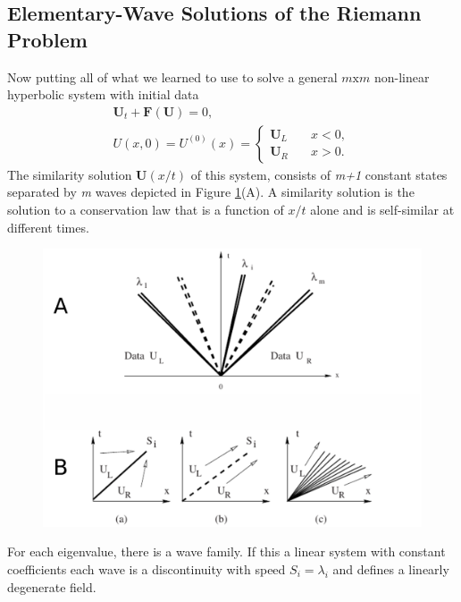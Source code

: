 \documentclass[]{article}
\begin{document}
	\subsection{Elementary-Wave Solutions of the Riemann Problem}
		Now putting all of what we learned to use to solve a general $ m \mbox{x} m $ non-linear hyperbolic system with initial data
		\begin{equation}
			\begin{aligned}
				\textbf{U}_t + \textbf{F}(\textbf{U}) = 0 \mbox{, } \\
				U(x,0) = U^{(0)}(x) = \left\{
				\begin{array}{ll}
					\textbf{U}_L & \quad x < 0, \\
					\textbf{U}_R & \quad x > 0.
				\end{array}
			\right.
			\end{aligned}
			\label{RPEquation}
		\end{equation}
		The similarity solution $ \textbf{U}(x/t) $ of this system, consists of \textit{m+1} constant states separated by \textit{m} waves depicted in Figure \ref{ElementaryWaveSolutions}(A). A similarity solution is the solution to a conservation law that is a function of $ x/t $ alone and is self-similar at different times.
			
		\begin{figure}[h] 	
			\centering
			\includegraphics[scale=.55]{ElementaryWaveSolutions}
			\caption{}
			\label{ElementaryWaveSolutions}
		\end{figure}
		For each eigenvalue, there is a wave family. If this a linear system with constant coefficients each wave is a discontinuity with speed $ S_i = \lambda_i $ and defines a linearly degenerate field.
		
\end{document}
